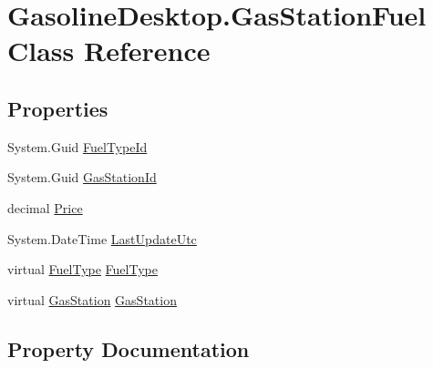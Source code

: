 \hypertarget{class_gasoline_desktop_1_1_gas_station_fuel}{}\section{Gasoline\+Desktop.\+Gas\+Station\+Fuel Class Reference}
\label{class_gasoline_desktop_1_1_gas_station_fuel}
\subsection*{Properties}
\begin{DoxyCompactItemize}
\item 
System.\+Guid \mbox{\hyperlink{class_gasoline_desktop_1_1_gas_station_fuel_afbf5db552e86172121349891fd447982}{Fuel\+Type\+Id}}
\item 
System.\+Guid \mbox{\hyperlink{class_gasoline_desktop_1_1_gas_station_fuel_a2d5583d6785a151c21bddd6e827176e2}{Gas\+Station\+Id}}
\item 
decimal \mbox{\hyperlink{class_gasoline_desktop_1_1_gas_station_fuel_a799588ab4c40fa543cc905bc34bb4e80}{Price}}
\item 
System.\+Date\+Time \mbox{\hyperlink{class_gasoline_desktop_1_1_gas_station_fuel_a32f7c63b98e522144dd93a0eebe2d2df}{Last\+Update\+Utc}}
\item 
virtual \mbox{\hyperlink{class_gasoline_desktop_1_1_fuel_type}{Fuel\+Type}} \mbox{\hyperlink{class_gasoline_desktop_1_1_gas_station_fuel_a3b6850b03983620d8258f15af6ab8b85}{Fuel\+Type}}
\item 
virtual \mbox{\hyperlink{class_gasoline_desktop_1_1_gas_station}{Gas\+Station}} \mbox{\hyperlink{class_gasoline_desktop_1_1_gas_station_fuel_a1666f2cd2bf75e71cdf8399adce75e5d}{Gas\+Station}}
\end{DoxyCompactItemize}


\subsection{Property Documentation}
\mbox{\label{class_gasoline_desktop_1_1_gas_station_fuel_a3b6850b03983620d8258f15af6ab8b85}} 
